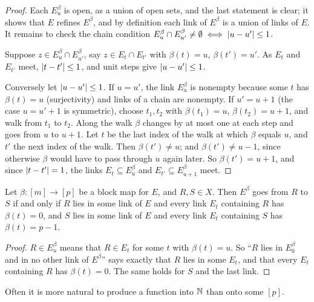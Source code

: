 \begin{proof}
Each $E^\beta_u$ is open, as a union of open sets, and the last statement is clear; it shows that $E$
refines $E^\beta$, and by definition each link of $E^\beta$ is a union of links of $E$. It remains to
check the chain condition $E^\beta_u\cap E^\beta_{u'}\ne\emptyset\iff\left\lvert u-u'\right\rvert\le1$.

Suppose $z\in E^\beta_u\cap E^\beta_{u'}$, say $z\in E_t\cap E_{t'}$ with $\beta(t)=u$, $\beta(t')=u'$.
As $E_t$ and $E_{t'}$ meet, $\left\lvert t-t'\right\rvert\le1$, and unit steps give $\left\lvert u-u'\right\rvert\le1$.

Conversely let $\left\lvert u-u'\right\rvert\le 1$. If $u=u'$, the link $E^\beta_u$ is nonempty because some $t$ has
$\beta(t)=u$ (surjectivity) and links of a chain are nonempty. If $u'=u+1$ (the case $u=u'+1$ is
symmetric), choose $t_1,t_2$ with $\beta(t_1)=u$, $\beta(t_2)=u+1$, and walk from $t_1$ to $t_2$. Along
the walk $\beta$ changes by at most one at each step and goes from $u$ to $u+1$. Let $t$ be the last
index of the walk at which $\beta$ equals $u$, and $t'$ the next index of the walk. Then $\beta(t')\ne u$;
and $\beta(t')\neq u-1$, since otherwise $\beta$ would have to pass through $u$ again later. So
$\beta(t')=u+1$, and since $\left\lvert t-t'\right\rvert=1$, the links $E_t\subseteq E^\beta_u$ and $E_{t'}\subseteq
E^\beta_{u+1}$ meet.
\end{proof}


\begin{lemma}\label{lem:block-from}
Let $\beta\colon[m]\to[p]$ be a block map for $E$, and $R,S\in X$. Then $E^\beta$ goes from $R$ to $S$
if and only if $R$ lies in some link of $E$ and every link $E_t$ containing $R$ has $\beta(t)=0$, and $S$
lies in some link of $E$ and every link $E_t$ containing $S$ has $\beta(t)=p-1$.
\end{lemma}

\begin{proof}
$R\in E^\beta_u$ means that $R\in E_t$ for some $t$ with $\beta(t)=u$. So ``$R$ lies in $E^\beta_0$ and in no
other link of $E^\beta$'' says exactly that $R$ lies in some $E_t$, and that every $E_t$ containing $R$
has $\beta(t)=0$. The same holds for $S$ and the last link.
\end{proof}


Often it is more natural to produce a function into $\mathbb{N}$ than onto some $[p]$.

